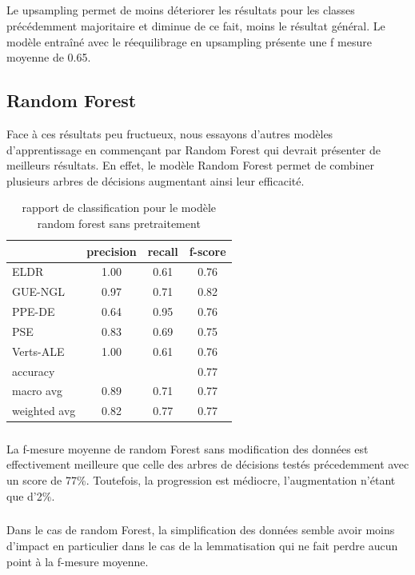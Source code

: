 \documentclass[11pt]{article}
\begin{document}
\subparagraph{}
Le upsampling permet de moins déteriorer les résultats pour les classes précédemment majoritaire et diminue de ce fait, moins le résultat général. Le modèle entraîné avec le réequilibrage en upsampling présente une f mesure moyenne de 0.65.

\subsection{Random Forest}
Face à ces résultats peu fructueux, nous essayons d'autres modèles d'apprentissage en commençant par Random Forest qui devrait présenter de meilleurs résultats. En effet, le modèle Random Forest permet de combiner plusieurs arbres de décisions augmentant ainsi leur efficacité.


\begin{table}[h]
\centering
\begin{tabular}{lccc}
\hline
 & precision & recall & f-score\\
\hline
ELDR & 1.00 & 0.61 & 0.76\\
GUE-NGL& 0.97 &0.71 & 0.82\\
PPE-DE & 0.64 &0.95 & 0.76\\ 
PSE &  0.83&  0.69 & 0.75\\ 
Verts-ALE &  1.00 & 0.61& 0.76\\
\hline
accuracy& & &    0.77 \\
macro avg &  0.89 &  0.71 &  0.77 \\
weighted avg &  0.82 & 0.77  &  0.77  \\
\hline
\end{tabular}
\caption{rapport de classification pour le modèle random forest sans pretraitement}
\label{tab:randomForest}
\end{table}

\subparagraph{}
La f-mesure moyenne de random Forest sans modification des données est effectivement meilleure que celle des arbres de décisions testés précedemment avec un score de 77\%. Toutefois, la progression est médiocre, l'augmentation n'étant que d'2\%.
\subparagraph{}
Dans le cas de random Forest, la simplification des données semble avoir moins d'impact en particulier dans le cas de la lemmatisation qui ne fait perdre aucun point à la f-mesure moyenne.
\end{document}
